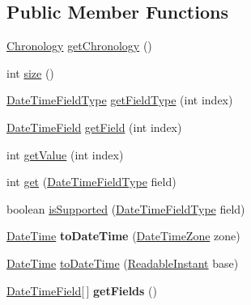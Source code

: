 \subsection*{Public Member Functions}
\begin{DoxyCompactItemize}
\item 
\hyperlink{classorg_1_1joda_1_1time_1_1_chronology}{Chronology} \hyperlink{classorg_1_1joda_1_1time_1_1_mock_partial_a78d22e8eea48a97aa3132b8a3f64f143}{get\-Chronology} ()
\item 
int \hyperlink{classorg_1_1joda_1_1time_1_1_mock_partial_aad4f468f8f3bf4a0ef0342e6e7153130}{size} ()
\item 
\hyperlink{classorg_1_1joda_1_1time_1_1_date_time_field_type}{Date\-Time\-Field\-Type} \hyperlink{classorg_1_1joda_1_1time_1_1_mock_partial_a7eb51a25ed937d2d4f41df0adbcee756}{get\-Field\-Type} (int index)
\item 
\hyperlink{classorg_1_1joda_1_1time_1_1_date_time_field}{Date\-Time\-Field} \hyperlink{classorg_1_1joda_1_1time_1_1_mock_partial_a3736aa1d57c2a8a9c738a2e71d34f813}{get\-Field} (int index)
\item 
int \hyperlink{classorg_1_1joda_1_1time_1_1_mock_partial_ab3ff5413fdf83a1ee727758e2c9c79bd}{get\-Value} (int index)
\item 
int \hyperlink{classorg_1_1joda_1_1time_1_1_mock_partial_aed6a477f0d093bdf71d8d78f4be313b9}{get} (\hyperlink{classorg_1_1joda_1_1time_1_1_date_time_field_type}{Date\-Time\-Field\-Type} field)
\item 
boolean \hyperlink{classorg_1_1joda_1_1time_1_1_mock_partial_acd859d61afeb86bbfa0ea43eb965556c}{is\-Supported} (\hyperlink{classorg_1_1joda_1_1time_1_1_date_time_field_type}{Date\-Time\-Field\-Type} field)
\item 
\hypertarget{classorg_1_1joda_1_1time_1_1_mock_partial_afeabe353a0bb09e35928bfda3aa5f61f}{\hyperlink{classorg_1_1joda_1_1time_1_1_date_time}{Date\-Time} {\bfseries to\-Date\-Time} (\hyperlink{classorg_1_1joda_1_1time_1_1_date_time_zone}{Date\-Time\-Zone} zone)}\label{classorg_1_1joda_1_1time_1_1_mock_partial_afeabe353a0bb09e35928bfda3aa5f61f}

\item 
\hyperlink{classorg_1_1joda_1_1time_1_1_date_time}{Date\-Time} \hyperlink{classorg_1_1joda_1_1time_1_1_mock_partial_a0f59e6f8002a6a6914dc08d640132c47}{to\-Date\-Time} (\hyperlink{interfaceorg_1_1joda_1_1time_1_1_readable_instant}{Readable\-Instant} base)
\item 
\hypertarget{classorg_1_1joda_1_1time_1_1_mock_partial_a73adf3790e5526a19ae379fdbe9a84ee}{\hyperlink{classorg_1_1joda_1_1time_1_1_date_time_field}{Date\-Time\-Field}\mbox{[}$\,$\mbox{]} {\bfseries get\-Fields} ()}\label{classorg_1_1joda_1_1time_1_1_mock_partial_a73adf3790e5526a19ae379fdbe9a84ee}


\end{DoxyCompactItemize}
